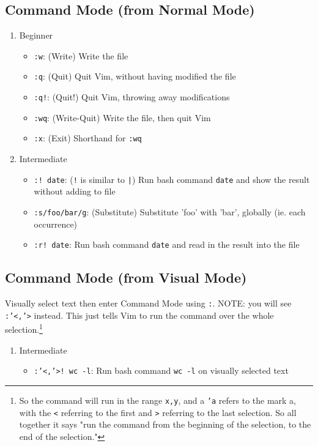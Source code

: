 \documentclass[11pt]{article}
\begin{document}
\subsection{Command Mode (from Normal Mode)}
\label{sec:orgec0e2cb}
\begin{enumerate}
\item Beginner
\label{sec:orga88227b}
\begin{itemize}
\item \texttt{:w}: (Write) Write the file
\item \texttt{:q}: (Quit) Quit Vim, without having modified the file
\item \texttt{:q!}: (Quit!) Quit Vim, throwing away modifications
\item \texttt{:wq}: (Write-Quit) Write the file, then quit Vim
\item \texttt{:x}: (Exit) Shorthand for \texttt{:wq}
\end{itemize}
\item Intermediate
\label{sec:org2557687}
\begin{itemize}
\item \texttt{:! date}: (\texttt{!} is similar to \texttt{|}) Run bash command \texttt{date} and show the result without adding to file
\item \texttt{:s/foo/bar/g}: (Substitute) Substitute 'foo' with 'bar', globally (ie. each occurrence)
\item \texttt{:r! date}: Run bash command \texttt{date} and read in the result into the file
\end{itemize}
\end{enumerate}
\subsection{Command Mode (from Visual Mode)}
\label{sec:orgfeb479f}
Visually select text then enter Command Mode using \texttt{:}. NOTE: you will see
\texttt{:'<,'>} instead. This just tells Vim to run the command over the whole
selection.\footnote{So the command will run in the range \texttt{x,y}, and 
a \texttt{'a} refers to the mark a, with the \texttt{<} referring to the first and \texttt{>}
referring to the last selection. So all together it says "run the command from
the beginning of the selection, to the end of the selection."}
\begin{enumerate}
\item Intermediate
\label{sec:org675b8e3}
\begin{itemize}
\item \texttt{:'<,'>! wc -l}: Run bash command \texttt{wc -l} on visually selected text
\end{itemize}
\end{enumerate}
\end{document}
